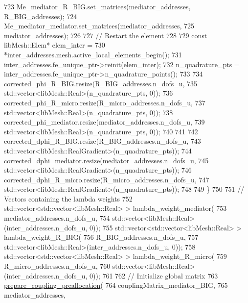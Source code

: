 \begin{DoxyCode}
723             Me\_mediator\_R\_BIG.set\_matrices(mediator\_addresses, R\_BIG\_addresses);
724             Me\_mediator\_mediator.set\_matrices(mediator\_addresses,
725                     mediator\_addresses);
726 
727             \textcolor{comment}{// Restart the element}
728 
729             \textcolor{keyword}{const} libMesh::Elem* elem\_inter =
730                     *inter\_addresses.mesh.active\_local\_elements\_begin();
731             inter\_addresses.fe\_unique\_ptr->reinit(elem\_inter);
732             n\_quadrature\_pts = inter\_addresses.fe\_unique\_ptr->n\_quadrature\_points();
733 
734             corrected\_phi\_R\_BIG.resize(R\_BIG\_addresses.n\_dofs\_u,
735                     std::vector<libMesh::Real>(n\_quadrature\_pts, 0));
736             corrected\_phi\_R\_micro.resize(R\_micro\_addresses.n\_dofs\_u,
737                     std::vector<libMesh::Real>(n\_quadrature\_pts, 0));
738             corrected\_phi\_mediator.resize(mediator\_addresses.n\_dofs\_u,
739                     std::vector<libMesh::Real>(n\_quadrature\_pts, 0));
740 
741 
742                 corrected\_dphi\_R\_BIG.resize(R\_BIG\_addresses.n\_dofs\_u,
743                         std::vector<libMesh::RealGradient>(n\_quadrature\_pts));
744                 corrected\_dphi\_mediator.resize(mediator\_addresses.n\_dofs\_u,
745                         std::vector<libMesh::RealGradient>(n\_quadrature\_pts));
746                 corrected\_dphi\_R\_micro.resize(R\_micro\_addresses.n\_dofs\_u,
747                         std::vector<libMesh::RealGradient>(n\_quadrature\_pts));
748 
749         \}
750 
751         \textcolor{comment}{// Vectors containing the lambda weights}
752         std::vector<std::vector<libMesh::Real> > lambda\_weight\_mediator(
753                 mediator\_addresses.n\_dofs\_u,
754                 std::vector<libMesh::Real>(inter\_addresses.n\_dofs\_u, 0));
755         std::vector<std::vector<libMesh::Real> > lambda\_weight\_R\_BIG(
756                 R\_BIG\_addresses.n\_dofs\_u,
757                 std::vector<libMesh::Real>(inter\_addresses.n\_dofs\_u, 0));
758         std::vector<std::vector<libMesh::Real> > lambda\_weight\_R\_micro(
759                 R\_micro\_addresses.n\_dofs\_u,
760                 std::vector<libMesh::Real>(inter\_addresses.n\_dofs\_u, 0));
761 
762         \textcolor{comment}{// Initialize global matrix}
763         \hyperlink{classcarl_1_1assemble__coupling__matrices_ace985578e3743b194f9058431735d997}{prepare\_coupling\_preallocation}(
764                 couplingMatrix\_mediator\_BIG,
765                 mediator\_addresses,

\end{DoxyCode}
